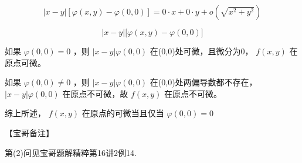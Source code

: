 \documentclass[11pt,fontset=fandol]{ctexart}
\begin{document}
\[
\left| x - y \right| \left[ \varphi ( x , y ) - \varphi ( 0 , 0 ) \right] = 0 \cdot x + 0 \cdot y + o ( \sqrt { x ^ { 2 } + y ^ { 2 } } )
\]

\[
\big | x - y \big | \big [ \varphi ( x , y ) - \varphi ( 0 , 0 ) \big ]
\]

如果 \(\varphi ( 0 , 0 ) = 0\) ，则
\(\left| x - y \right| \varphi ( 0 , 0 )\) 在(0,0)处可微，且微分为0，
\(f ( x , y )\) 在原点可微。

如果 \(\varphi ( 0 , 0 ) \neq 0\) ，则
\(\left| x - y \right| \varphi ( 0 , 0 )\) 在(0,0)处两偏导数都不存在，
\(\left| x - y \right| \varphi ( 0 , 0 )\) 在原点不可微，故
\(f ( x , y )\) 在原点不可微。

综上所述， \(f ( x , y )\) 在原点的可微当且仅当
\(\varphi ( 0 , 0 ) = 0\)

【宝哥备注】

第(2)问见宝哥题解精粹第16讲2例14.
\end{document}

